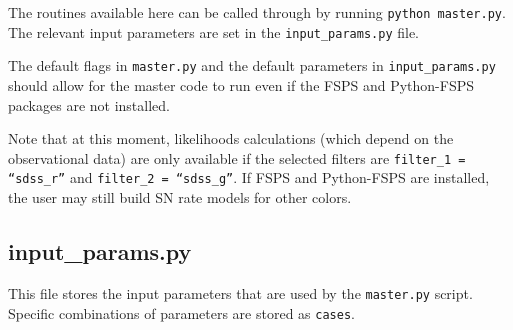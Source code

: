 \documentclass[manuscript]{aastex}
\begin{document}
The routines available here can be called through by running \texttt{python master.py}. The relevant input parameters are set in the \texttt{input\_params.py} file.

The default flags in \texttt{master.py} and the default parameters in 
\texttt{input\_params.py} should allow for the master code to run even if the FSPS and Python-FSPS packages are not installed.

Note that at this moment, likelihoods calculations (which depend on the observational data) are only available if the selected filters are \texttt{filter\_1 = ``sdss\_r''} and \texttt{filter\_2 = ``sdss\_g''}. If FSPS and Python-FSPS are installed, the user may still build SN rate models for other colors.

\subsection{input\_params.py}
\label{subsec:input}

This file stores the input parameters that are used by the \texttt{master.py} script. Specific combinations of parameters are stored as \texttt{cases}.
\end{document}
